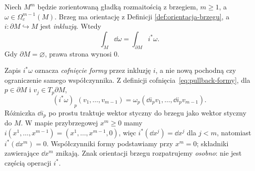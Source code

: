 \begin{twierdzenie}
\label{thm:stokes-formy}
Niech $M^m$ będzie zorientowaną gładką rozmaitością
z brzegiem, $m\geq1$, a $\omega\in\Omega_c^{m-1}(M)$.
Brzeg ma orientację z Definicji
\ref{def:orientacja-brzegu}, a
$i:\partial M\hookrightarrow M$ jest \emph{inkluzją}.
Wtedy
\begin{equation}\label{eq:stokes-formy}
 \boxed{\displaystyle \int_M\dd\omega
        =\int_{\partial M}i^*\omega.}
\end{equation}
Gdy $\partial M=\varnothing$, prawa strona wynosi $0$.
\end{twierdzenie}

Zapis $i^*\omega$ oznacza \emph{cofnięcie formy}
przez inkluzję $i$, a nie nową pochodną czy
ograniczenie samego współczynnika. Z definicji
cofnięcia~\eqref{eq:pullback-formy}, dla
$p\in\partial M$ i $v_j\in T_p\partial M$,
\begin{equation}\label{eq:inkluzja-formy}
 (i^*\omega)_p(v_1,\ldots,v_{m-1})
 =\omega_p(\dd i_pv_1,\ldots,\dd i_pv_{m-1}).
\end{equation}
Różniczka $\dd i_p$ po prostu traktuje wektor
styczny do brzegu jako wektor styczny do $M$.
W mapie przybrzegowej $x^m\geq0$ mamy
$i(x^1,\ldots,x^{m-1})=(x^1,\ldots,x^{m-1},0)$,
więc $i^*(\dd x^j)=\dd x^j$ dla $j<m$, natomiast
$i^*(\dd x^m)=0$. Współczynniki formy podstawiamy
przy $x^m=0$; składniki zawierające $\dd x^m$
znikają. Znak orientacji brzegu rozpatrujemy
\emph{osobno}: nie jest częścią operacji $i^*$.

